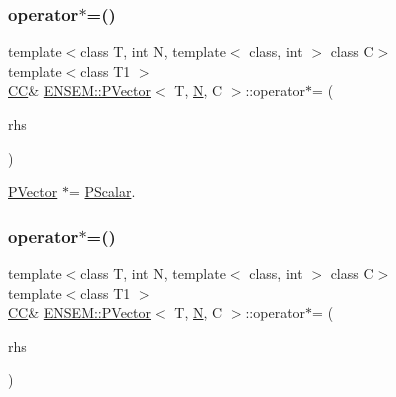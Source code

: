 \subsubsection{\texorpdfstring{operator$\ast$=()}{operator*=()}\hspace{0.1cm}{\footnotesize\ttfamily [1/3]}}
{\footnotesize\ttfamily template$<$class T, int N, template$<$ class, int $>$ class C$>$ \\
template$<$class T1 $>$ \\
\mbox{\hyperlink{classENSEM_1_1PVector_a92dc0a0a301a3dc96f7be5d337019bc7}{CC}}\& \mbox{\hyperlink{classENSEM_1_1PVector}{E\+N\+S\+E\+M\+::\+P\+Vector}}$<$ T, \mbox{\hyperlink{adat__devel_2lib_2hadron_2operator__name__util_8cc_a7722c8ecbb62d99aee7ce68b1752f337}{N}}, C $>$\+::operator$\ast$= (\begin{DoxyParamCaption}\item[{const \mbox{\hyperlink{classENSEM_1_1PScalar}{P\+Scalar}}$<$ T1 $>$ \&}]{rhs }\end{DoxyParamCaption})\hspace{0.3cm}{\ttfamily [inline]}}



\mbox{\hyperlink{classENSEM_1_1PVector}{P\+Vector}} $\ast$= \mbox{\hyperlink{classENSEM_1_1PScalar}{P\+Scalar}}. 

\mbox{\label{classENSEM_1_1PVector_af17add91449d0507d1a0361ba1a3cc64}} 
\subsubsection{\texorpdfstring{operator$\ast$=()}{operator*=()}\hspace{0.1cm}{\footnotesize\ttfamily [2/3]}}
{\footnotesize\ttfamily template$<$class T, int N, template$<$ class, int $>$ class C$>$ \\
template$<$class T1 $>$ \\
\mbox{\hyperlink{classENSEM_1_1PVector_a92dc0a0a301a3dc96f7be5d337019bc7}{CC}}\& \mbox{\hyperlink{classENSEM_1_1PVector}{E\+N\+S\+E\+M\+::\+P\+Vector}}$<$ T, \mbox{\hyperlink{adat__devel_2lib_2hadron_2operator__name__util_8cc_a7722c8ecbb62d99aee7ce68b1752f337}{N}}, C $>$\+::operator$\ast$= (\begin{DoxyParamCaption}\item[{const \mbox{\hyperlink{classENSEM_1_1PScalar}{P\+Scalar}}$<$ T1 $>$ \&}]{rhs }\end{DoxyParamCaption})\hspace{0.3cm}{\ttfamily [inline]}}



